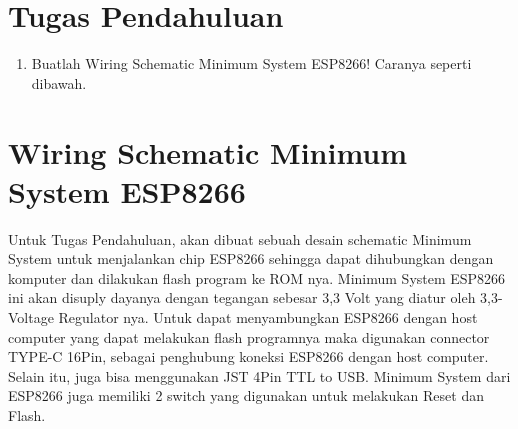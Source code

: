 \section{Tugas Pendahuluan}
\begin{enumerate}
    \item Buatlah Wiring Schematic Minimum System ESP8266! Caranya seperti dibawah.
\end{enumerate}

\section{Wiring Schematic Minimum System ESP8266}
Untuk Tugas Pendahuluan, akan dibuat sebuah desain schematic Minimum System untuk menjalankan 
chip ESP8266 sehingga dapat dihubungkan dengan komputer dan dilakukan flash program ke ROM nya. 
Minimum System ESP8266 ini akan disuply dayanya dengan tegangan sebesar 3,3 Volt yang diatur 
oleh 3,3-Voltage Regulator nya. Untuk dapat menyambungkan ESP8266 dengan host computer yang 
dapat melakukan flash programnya maka digunakan connector TYPE-C 16Pin, 
sebagai penghubung koneksi ESP8266 dengan host computer. Selain itu, juga bisa menggunakan JST 4Pin TTL to USB.
Minimum System dari ESP8266 juga memiliki 
2 switch yang digunakan untuk melakukan Reset dan Flash.
